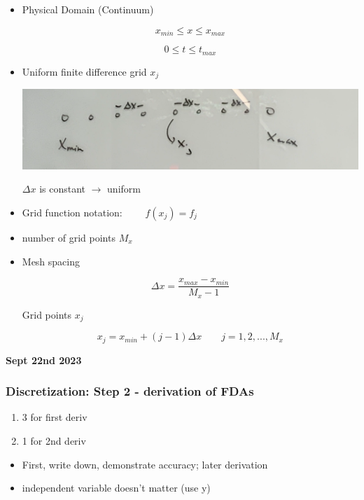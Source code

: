 \begin{itemize}
    \item Physical Domain (Continuum)

    \[ x_{min} \leq x \leq x_{max}\]

    \[ 0 \leq t \leq t_{max}\]
    
    \item Uniform finite difference grid $x_j$

    \includegraphics[width = 0.9 \linewidth]{Images/410_discretizationstep.png}


    $\Delta x$ is constant $\rightarrow$ uniform

    \item Grid function notation: $\qquad f(x_j) = f_j$
    \item number of grid points $M_x$

    \item Mesh spacing 

    \[ \Delta x = \frac{x_{max}-x_{min}}{M_x - 1}\]

    Grid points $x_j$

    \[ x_j = x_{min} + (j-1) \Delta x \qquad j = 1,2,...,M_x\]

\end{itemize}

\textbf{Sept 22nd 2023}

\subsubsection{Discretization: Step 2 - derivation of FDAs}

\begin{enumerate}
    \item 3 for first deriv
    \item 1 for 2nd deriv
\end{enumerate}

\begin{itemize}
    \item First, write down, demonstrate accuracy; later derivation
    \item independent variable doesn't matter (use y)
\end{itemize}

